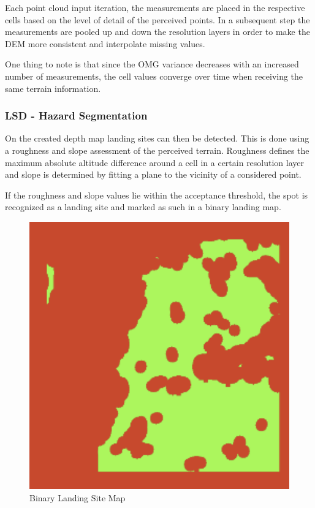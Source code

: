 Each point cloud input iteration, the measurements are placed in the respective cells based on the level of detail of the perceived points. In a subsequent step the measurements are pooled up and down the resolution layers in order to make the DEM more consistent and interpolate missing values.

One thing to note is that since the OMG variance decreases with an increased number of measurements, the cell values converge over time when receiving the same terrain information.

\subsubsection{LSD - Hazard Segmentation}

On the created depth map landing sites can then be detected. This is done using a roughness and slope assessment of the perceived terrain. Roughness defines the maximum absolute altitude difference around a cell in a certain resolution layer and slope is determined by fitting a plane to the vicinity of a considered point.

If the roughness and slope values lie within the acceptance threshold, the spot is recognized as a landing site and marked as such in a binary landing map. 

\begin{figure}[ht!]
    \centering
    \includegraphics[scale=0.5]{images/setup/ls_map.png}
    \caption{Binary Landing Site Map}
    \label{fig:ls_map}
\end{figure}

